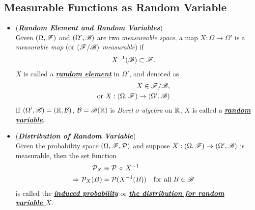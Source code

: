 \documentclass[11pt]{article}
\begin{document}
\subsection{Measurable Functions as Random Variable}
\begin{itemize}
\item \begin{definition} (\emph{\textbf{Random Element  and Random Variables}})\\
Given $(\Omega, {\mathscr F})$ and $(\Omega', {\mathscr B})$ are two \emph{measureable space}, a map $X: \Omega \rightarrow \Omega'$ is a \emph{measurable map} (or $({\mathscr F}/{\mathscr B})$ \emph{measurable}) if
\begin{align*}
X^{-1}({\mathscr B}) \subset {\mathscr F}.
\end{align*}
$X$ is called a \underline{\emph{\textbf{random element}}} in $\Omega'$, and denoted as
\begin{align*}
X\in {\mathscr F}/{\mathscr B}, \\
\text{or } X: (\Omega, {\mathscr F}) \rightarrow (\Omega', {\mathscr B})
\end{align*}
If $(\Omega', {\mathscr B}) = ({\mathbb R}, {\mathcal B})$, ${\mathcal B}={\mathscr B}({\mathbb R})$ is \emph{Borel $\sigma$-algebra} on ${\mathbb R}$, $X$ is called a \underline{\emph{\textbf{random variable}}}.
\end{definition}


\item   \begin{definition} (\emph{\textbf{Distribution of Random Variable}})\\
Given the probability space $(\Omega, {\mathscr F}, {\mathcal P})$ and suppose $X: (\Omega, {\mathscr F}) \rightarrow (\Omega', {\mathscr B})$ is measurable, then the set function 
\begin{align*}
{\mathcal P}_{X} &\equiv {\mathcal P}\,\circ\, X^{-1} \\
\Rightarrow {\mathcal P}_{X}(B) &= {\mathcal P}(X^{-1}(B)) \quad \text{for all }B \in {\mathscr B} 
\end{align*}
is called the \underline{\emph{\textbf{induced probability}}} or \underline{\emph{\textbf{the distribution for random variable $X$}}}. 


\end{definition}
\end{itemize}
\end{document}
